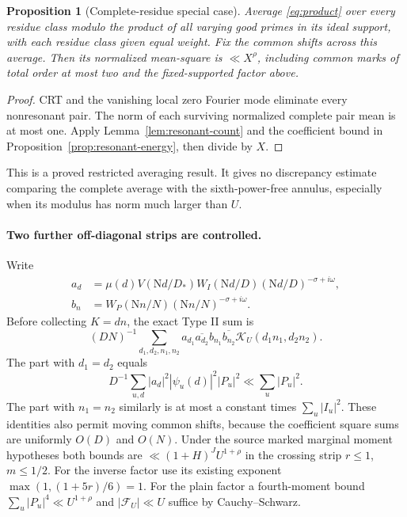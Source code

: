 \documentclass[11pt]{article}
\newtheorem{proposition}[lemma]{Proposition}
\newcommand{\N}{\mathrm N}
\begin{document}
\begin{proposition}[Complete-residue special case]\label{prop:complete}
Average \eqref{eq:product} over every residue class modulo the product
of all varying good primes in its ideal support, with each residue class
given equal weight. Fix the common shifts across this average.
Then its normalized mean-square is $\ll X^\rho$, including common marks
of total order at most two and the fixed-supported factor above.
\end{proposition}
\begin{proof}
CRT and the vanishing local zero Fourier mode eliminate every nonresonant
pair. The norm of each surviving normalized complete pair mean is at most
one. Apply Lemma~\ref{lem:resonant-count} and the coefficient bound in
Proposition~\ref{prop:resonant-energy}, then divide by $X$.
\end{proof}
This is a proved restricted averaging result. It gives no discrepancy
estimate comparing the complete average with the sixth-power-free annulus,
especially when its modulus has norm much larger than $U$.

\paragraph{Two further off-diagonal strips are controlled.}
Write
\[
\begin{aligned}
 a_d&=\mu(d)V(\N d/D_*)W_I(\N d/D)(\N d/D)^{-\sigma+i\omega},\\
 b_n&=W_P(\N n/N)(\N n/N)^{-\sigma+i\omega}.
\end{aligned}
\]
Before collecting $K=dn$, the exact Type II sum is
\begin{equation}\label{eq:typeII}
 (DN)^{-1}\sum_{d_1,d_2,n_1,n_2}
 a_{d_1}\overline{a_{d_2}}b_{n_1}\overline{b_{n_2}}
 \mathcal K_U(d_1n_1,d_2n_2).
\end{equation}
The part with $d_1=d_2$ equals
\[
 D^{-1}\sum_{u,d}|a_d|^2|\psi_u(d)|^2|P_u|^2
 \ll\sum_u|P_u|^2.
\]
The part with $n_1=n_2$ similarly is at most a constant times
$\sum_u|I_u|^2$. These identities also permit moving common shifts,
because the coefficient square sums are uniformly $O(D)$ and $O(N)$.
Under the source marked marginal moment hypotheses both bounds are
$\ll(1+H)^J U^{1+\rho}$ in the crossing strip $r\le1$, $m\le1/2$.
For the inverse factor use its existing exponent
$\max(1,(1+5r)/6)=1$. For the plain factor a fourth-moment bound
$\sum_u|P_u|^4\ll U^{1+\rho}$ and $|\mathcal F_U|\ll U$ suffice
by Cauchy--Schwarz.
\end{document}
